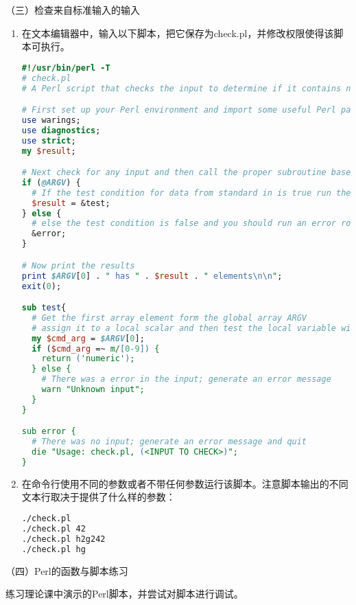 \vspace{0.1in}
（三）检查来自标准输入的输入
\begin{enumerate}
  \item 在文本编辑器中，输入以下脚本，把它保存为check.pl，并修改权限使得该脚本可执行。
\begin{lstlisting}[language=perl]
#!/usr/bin/perl -T
# check.pl
# A Perl script that checks the input to determine if it contains numeric information

# First set up your Perl environment and import some useful Perl packages
use warings;
use diagnostics;
use strict;
my $result;

# Next check for any input and then call the proper subroutine based on the test
if (@ARGV) {
  # If the test condition for data from standard in is true run the test subroutine on the input data
  $result = &test;
} else {
  # else the test condition is false and you should run an error routine.
  &error;
}

# Now print the results
print $ARGV[0] . " has " . $result . " elements\n\n";
exit(0);

sub test{
  # Get the first array element form the global array ARGV
  # assign it to a local scalar and then test the local variable with a regular expression
  my $cmd_arg = $ARGV[0];
  if ($cmd_arg =~ m/[0-9]) {
    return ('numeric');
  } else {
    # There was a error in the input; generate an error message
    warn "Unknown input";
  }
}

sub error {
  # There was no input; generate an error message and quit
  die "Usage: check.pl, (<INPUT TO CHECK>)";
}
\end{lstlisting}
  \item 在命令行使用不同的参数或者不带任何参数运行该脚本。注意脚本输出的不同文本行取决于提供了什么样的参数：
\begin{lstlisting}[language=bash]
./check.pl
./check.pl 42
./check.pl h2g242
./check.pl hg
\end{lstlisting}
\end{enumerate}

\vspace{0.1in}
（四）Perl的函数与脚本练习

练习理论课中演示的Perl脚本，并尝试对脚本进行调试。
